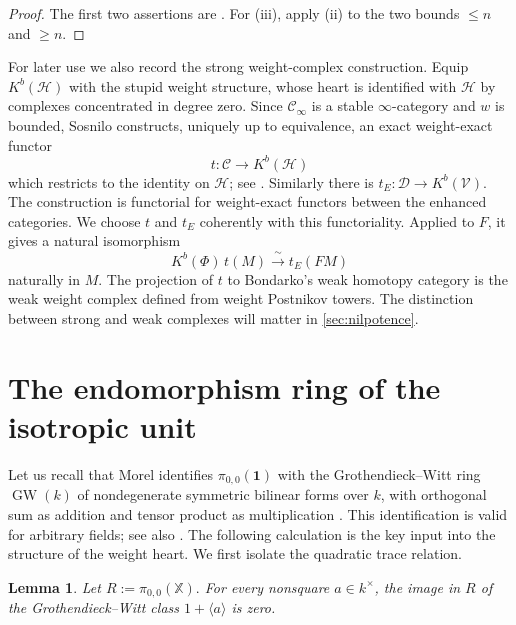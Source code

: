 \documentclass[11pt]{amsart}
\numberwithin{equation}{section}
\newtheorem{lemma}[theorem]{Lemma}
\theoremstyle{definition}
\theoremstyle{remark}
\DeclareMathOperator{\GW}{GW}
\newcommand{\X}{\mathbb X}
\newcommand{\one}{\mathbf 1}
\newcommand{\Cinf}{\mathcal C_{\infty}}
\newcommand{\C}{\mathcal C}
\newcommand{\D}{\mathcal D}
\newcommand{\Hh}{\mathcal H}
\newcommand{\V}{\mathcal V}
\begin{document}
\begin{proof}
  The first two assertions are
\cite[Theorem~1.5.1(1),(2)]{BondarkoWeightComplexes}.  For (iii), apply (ii)
to the two bounds $\le n$ and $\ge n$.
\end{proof}

For later use we also record the strong weight-complex construction.  Equip
$K^b(\Hh)$ with the stupid weight structure, whose heart is identified with
$\Hh$ by complexes concentrated in degree zero.  Since $\Cinf$ is a stable
$\infty$-category and $w$ is bounded, Sosnilo constructs, uniquely up to
equivalence, an exact
weight-exact functor
\begin{equation}\label{eq:strong-weight-complex}
  t\colon\C\longrightarrow K^b(\Hh)
\end{equation}
which restricts to the identity on $\Hh$; see
\cite[Section~3 and Corollary~3.5]{Sosnilo}.  Similarly there is
$t_E\colon\D\to K^b(\V)$.  The construction is functorial for 
weight-exact functors between the enhanced categories.  We choose $t$ and
$t_E$ coherently with this functoriality.  Applied to $F$, it gives a natural
isomorphism
\begin{equation}\label{eq:weight-complex-base-change}
  K^b(\Phi)\,t(M)\xrightarrow{\;\sim\;}t_E(FM)
\end{equation}
naturally in $M$.  The projection of $t$ to Bondarko's weak homotopy category
is the weak weight complex defined from weight Postnikov towers.  The
distinction between strong and weak complexes will matter in
\cref{sec:nilpotence}.

\section{The endomorphism ring of the isotropic unit}\label{sec:end-unit}

 
Let us recall that Morel identifies $\pi_{0,0}(\one)$ with the Grothendieck--Witt ring
$\GW(k)$ of nondegenerate symmetric bilinear forms over $k$, with orthogonal
sum as addition and tensor product as multiplication
\cite{MorelPiZero}.  This identification is valid for arbitrary fields; see
also \cite[footnote~1]{HoyoisTrace}.
The following calculation is the key input into the structure of the
weight heart.
We first isolate the quadratic trace relation.

\begin{lemma}\label{lem:quadratic-trace}
Let $R:=\pi_{0,0}(\X).$
For every nonsquare $a\in k^\times$, the image in $R$ of the Grothendieck--Witt class $1+\langle a\rangle$ is zero.
\end{lemma}
\end{document}
